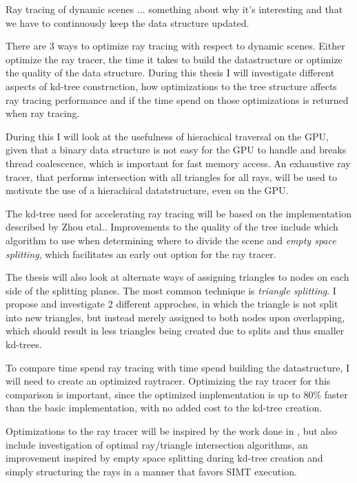 Ray tracing of dynamic scenes ... something about why it's interesting
and that we have to continuously keep the data structure updated.

There are 3 ways to optimize ray tracing with respect to dynamic
scenes. Either optimize the ray tracer, the time it takes to build the
datastructure or optimize the quality of the data structure. During
this thesis I will investigate different aspects of kd-tree
construction, how optimizations to the tree structure affects ray
tracing performance and if the time spend on those optimizations is
returned when ray tracing.

During this I will look at the usefulness of hierachical traversal
on the GPU, given that a binary data structure is not easy for the
GPU to handle and breaks thread coalescence, which is important for
fast memory access. An exhaustive ray tracer, that performs
intersection with all triangles for all rays, will be used to
motivate the use of a hierachical datatstructure, even on the GPU.

The kd-tree used for accelerating ray tracing will be based on the
implementation described by Zhou etal..
Improvements to the quality of the tree include which algorithm to use
when determining where to divide the scene and \textit{empty space
  splitting}, which facilitates an early out option for the ray
tracer. 

The thesis will also look at alternate ways of assigning triangles to
nodes on each side of the splitting planes. The most common technique
is \textit{triangle splitting}. I propose and investigate 2 different
approches, in which the triangle is not split into new triangles, but
instead merely assigned to both nodes upon overlapping, which should
result in less triangles being created due to splits and thus smaller
kd-trees.

To compare time spend ray tracing with time spend building the
datastructure, I will need to create an optimized
raytracer. Optimizing the ray tracer for this comparison is important,
since the optimized implementation is up to 80\% faster than the basic
implementation, with no added cost to the kd-tree creation.

Optimizations to the ray tracer will be inspired by the work done in
, but also include investigation of optimal
ray/triangle intersection algorithms, an improvement inspired by
empty space splitting during kd-tree creation and simply structuring
the rays in a manner that favors SIMT execution.


